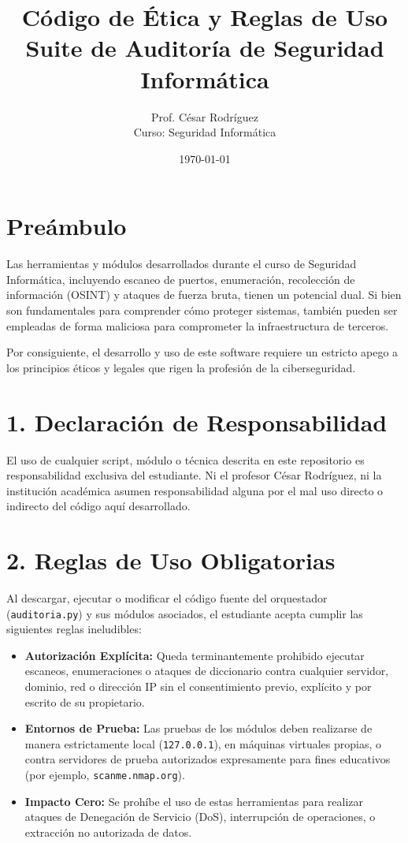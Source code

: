 \documentclass[12pt,a4paper]{article}
\title{\textbf{Código de Ética y Reglas de Uso}\\ \large Suite de Auditoría de Seguridad Informática}
\author{Prof. César Rodríguez \\ \small Curso: Seguridad Informática}
\date{\today}
\begin{document}
\maketitle

\section*{Preámbulo}
Las herramientas y módulos desarrollados durante el curso de Seguridad Informática, incluyendo escaneo de puertos, enumeración, recolección de información (OSINT) y ataques de fuerza bruta, tienen un potencial dual. Si bien son fundamentales para comprender cómo proteger sistemas, también pueden ser empleadas de forma maliciosa para comprometer la infraestructura de terceros.

Por consiguiente, el desarrollo y uso de este software requiere un estricto apego a los principios éticos y legales que rigen la profesión de la ciberseguridad.

\section*{1. Declaración de Responsabilidad}
El uso de cualquier script, módulo o técnica descrita en este repositorio es responsabilidad exclusiva del estudiante. Ni el profesor César Rodríguez, ni la institución académica asumen responsabilidad alguna por el mal uso directo o indirecto del código aquí desarrollado.

\section*{2. Reglas de Uso Obligatorias}
Al descargar, ejecutar o modificar el código fuente del orquestador (\texttt{auditoria.py}) y sus módulos asociados, el estudiante acepta cumplir las siguientes reglas ineludibles:
\begin{itemize}
    \item \textbf{Autorización Explícita:} Queda terminantemente prohibido ejecutar escaneos, enumeraciones o ataques de diccionario contra cualquier servidor, dominio, red o dirección IP sin el consentimiento previo, explícito y por escrito de su propietario.
    \item \textbf{Entornos de Prueba:} Las pruebas de los módulos deben realizarse de manera estrictamente local (\texttt{127.0.0.1}), en máquinas virtuales propias, o contra servidores de prueba autorizados expresamente para fines educativos (por ejemplo, \texttt{scanme.nmap.org}).
    \item \textbf{Impacto Cero:} Se prohíbe el uso de estas herramientas para realizar ataques de Denegación de Servicio (DoS), interrupción de operaciones, o extracción no autorizada de datos.
\end{itemize}
\end{document}
